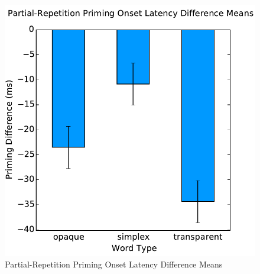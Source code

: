 \documentclass{frontiersSCNS}
\begin{document}
\begin{figure}
\begin{centering}
\includegraphics[scale=0.75]{images/latency_constituent_analysis}
\par\end{centering}
\caption{\label{fig:latency} Partial-Repetition Priming Onset Latency Difference Means}
\end{figure}
\end{document}
